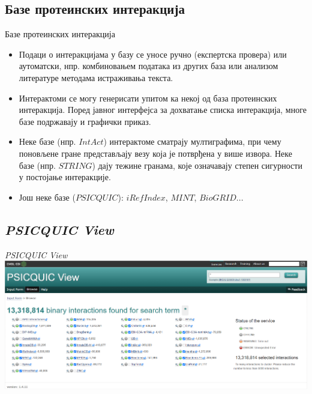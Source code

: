\documentclass[hyperref={bookmarks=false}]{beamer}
\begin{document}
\subsection{Базе протеинских интеракција}
\begin{frame}{Базе протеинских интеракција}
\begin{itemize}
	\item Подаци о интеракцијама у базу се уносе ручно (експертска провера) или аутоматски, нпр. комбиновањем података из других база или анализом литературе методама истраживања текста.

	\item Интерактоми се могу генерисати упитом ка некој од база протеинских интеракција. Поред јавног интерфејса за дохватање списка интеракција, многе базе подржавају и графички приказ.

	\item Неке базе (нпр. $IntAct$) интерактоме сматрају мултиграфима, при чему поновљене гране представљају везу која је потврђена у више извора. Неке базе (нпр. $STRING$) дају тежине гранама, које означавају степен сигурности у постојање интеракције.

	\item Још неке базе ($PSICQUIC$): $iRefIndex$, $MINT$, $BioGRID$...
\end{itemize}
\end{frame}

\subsection{\textit{PSICQUIC View}}
\begin{frame}{\textit{PSICQUIC View}}
\centering\includegraphics[width=\textwidth]{PSICQUIC.png}
\end{frame}
\end{document}
